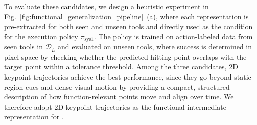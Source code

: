 

To evaluate these candidates, we design a heuristic experiment in Fig.~\ref{fig:functional_generalization_pipeline}~(a), where each representation is pre-extracted for both seen and unseen tools and directly used as the condition for the execution policy $\pi_{\mathrm{sys1}}$. The policy is trained on action-labeled data from seen tools in $\mathcal{D}_{L}$ and evaluated on unseen tools, where success is determined in pixel space by checking whether the predicted hitting point overlaps with the target point within a tolerance threshold. Among the three candidates, 2D keypoint trajectories achieve the best performance, since they go beyond static region cues and dense visual motion by providing a compact, structured description of how function-relevant points move and align over time. We therefore adopt 2D keypoint trajectories as the functional intermediate representation for \algoname{}.














